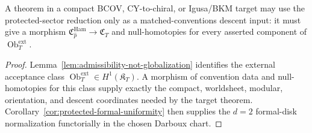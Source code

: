 \begin{cor}\label{cor:protected-matched-conventions-interface}
  A theorem in a compact BCOV, CY-to-chiral, or Igusa/BKM target may use
  the protected-sector reduction only as a matched-conventions descent
  input: it must give a morphism
  \(\mathfrak C_{\widehat p}^{\mathrm{Ham}}\to\mathfrak C_T\) and
  null-homotopies for every asserted component of
  \(\operatorname{Ob}^{\mathrm{ext}}_T\).
\end{cor}

\begin{proof}
  Lemma~\ref{lem:admissibility-not-globalization} identifies the
  external acceptance class
  \(\operatorname{Ob}^{\mathrm{ext}}_T\in H^1(\mathfrak K_T)\).  A
  morphism of convention data and null-homotopies for this class supply
  exactly the compact, worldsheet, modular, orientation, and descent
  coordinates needed by the target theorem.  Corollary~\ref{cor:protected-formal-uniformity}
  then supplies the \(d=2\) formal-disk normalization functorially in the
  chosen Darboux chart.
\end{proof}

